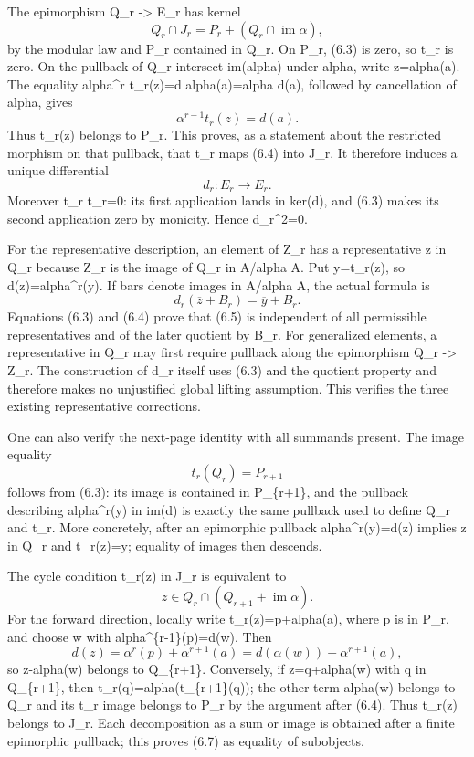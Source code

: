 \documentclass[11pt]{article}
\begin{document}
The epimorphism Q\_r -\textgreater{} E\_r has kernel \[
Q_r\cap J_r=P_r+(Q_r\cap\operatorname{im}\alpha),           \tag{6.4}
\] by the modular law and P\_r contained in Q\_r. On P\_r, (6.3) is zero, so t\_r is zero. On the pullback of Q\_r intersect im(alpha) under alpha, write z=alpha(a). The equality alpha\^{}r t\_r(z)=d alpha(a)=alpha d(a), followed by cancellation of alpha, gives \[
\alpha^{r-1}t_r(z)=d(a).
\] Thus t\_r(z) belongs to P\_r. This proves, as a statement about the restricted morphism on that pullback, that t\_r maps (6.4) into J\_r. It therefore induces a unique differential \[
d_r:E_r\longrightarrow E_r.
\] Moreover t\_r t\_r=0: its first application lands in ker(d), and (6.3) makes its second application zero by monicity. Hence d\_r\^{}2=0.

For the representative description, an element of Z\_r has a representative z in Q\_r because Z\_r is the image of Q\_r in A/alpha A. Put y=t\_r(z), so d(z)=alpha\^{}r(y). If bars denote images in A/alpha A, the actual formula is \[
d_r(\overline z+B_r)=\overline y+B_r.                     \tag{6.5}
\] Equations (6.3) and (6.4) prove that (6.5) is independent of all permissible representatives and of the later quotient by B\_r. For generalized elements, a representative in Q\_r may first require pullback along the epimorphism Q\_r -\textgreater{} Z\_r. The construction of d\_r itself uses (6.3) and the quotient property and therefore makes no unjustified global lifting assumption. This verifies the three existing representative corrections.

One can also verify the next-page identity with all summands present. The image equality \[
t_r(Q_r)=P_{r+1}                                         \tag{6.6}
\] follows from (6.3): its image is contained in P\_\{r+1\}, and the pullback describing alpha\^{}r(y) in im(d) is exactly the same pullback used to define Q\_r and t\_r. More concretely, after an epimorphic pullback alpha\^{}r(y)=d(z) implies z in Q\_r and t\_r(z)=y; equality of images then descends.

The cycle condition t\_r(z) in J\_r is equivalent to \[
z\in Q_r\cap(Q_{r+1}+\operatorname{im}\alpha).             \tag{6.7}
\] For the forward direction, locally write t\_r(z)=p+alpha(a), where p is in P\_r, and choose w with alpha\^{}\{r-1\}(p)=d(w). Then \[
d(z)=\alpha^r(p)+\alpha^{r+1}(a)
     =d(\alpha(w))+\alpha^{r+1}(a),
\] so z-alpha(w) belongs to Q\_\{r+1\}. Conversely, if z=q+alpha(w) with q in Q\_\{r+1\}, then t\_r(q)=alpha(t\_\{r+1\}(q)); the other term alpha(w) belongs to Q\_r and its t\_r image belongs to P\_r by the argument after (6.4). Thus t\_r(z) belongs to J\_r. Each decomposition as a sum or image is obtained after a finite epimorphic pullback; this proves (6.7) as equality of subobjects.
\end{document}
